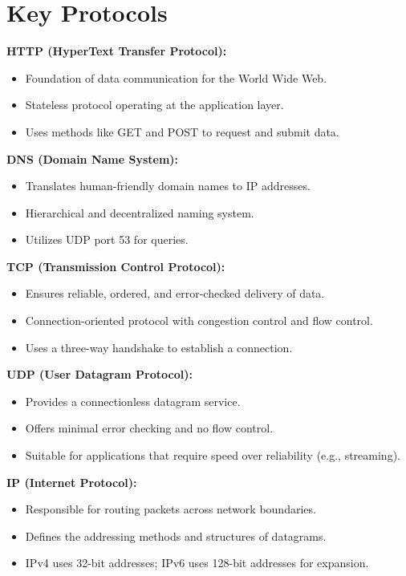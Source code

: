 \documentclass[10pt]{article}
\begin{document}
\section*{Key Protocols}

\textbf{HTTP (HyperText Transfer Protocol):}
\begin{itemize}
    \item Foundation of data communication for the World Wide Web.
    \item Stateless protocol operating at the application layer.
    \item Uses methods like GET and POST to request and submit data.
\end{itemize}

\textbf{DNS (Domain Name System):}
\begin{itemize}
    \item Translates human-friendly domain names to IP addresses.
    \item Hierarchical and decentralized naming system.
    \item Utilizes UDP port 53 for queries.
\end{itemize}

\textbf{TCP (Transmission Control Protocol):}
\begin{itemize}
    \item Ensures reliable, ordered, and error-checked delivery of data.
    \item Connection-oriented protocol with congestion control and flow control.
    \item Uses a three-way handshake to establish a connection.
\end{itemize}

\textbf{UDP (User Datagram Protocol):}
\begin{itemize}
    \item Provides a connectionless datagram service.
    \item Offers minimal error checking and no flow control.
    \item Suitable for applications that require speed over reliability (e.g., streaming).
\end{itemize}

\textbf{IP (Internet Protocol):}
\begin{itemize}
    \item Responsible for routing packets across network boundaries.
    \item Defines the addressing methods and structures of datagrams.
    \item IPv4 uses 32-bit addresses; IPv6 uses 128-bit addresses for expansion.
\end{itemize}
\end{document}
